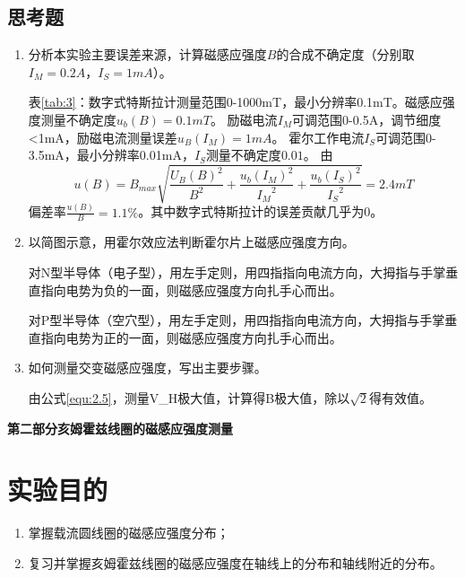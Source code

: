 \documentclass[11pt]{article}
\begin{document}
\subsection{思考题}
\begin{enumerate}
    \item 分析本实验主要误差来源，计算磁感应强度$B$的合成不确定度（分别取$I_M=0.2A$，$I_S=1mA$）。
    \par \hspace*{2em}表\ref{tab:3}：数字式特斯拉计测量范围0-1000mT，最小分辨率0.1mT。磁感应强度测量不确定度$u_b(B)=0.1mT$。
    励磁电流$I_M$可调范围0-0.5A，调节细度<1mA，励磁电流测量误差$u_B(I_M)=1mA$。
    霍尔工作电流$I_S$可调范围0-3.5mA，最小分辨率0.01mA，$I_S$测量不确定度$0.01$。
    由
    \[u(B)=B_{max}\sqrt{\frac{{U_B(B)}^2}{B^2}+\frac{{u_b(I_M)}^2}{{I_M}^2}+\frac{{u_b(I_S)}^2}{{I_S}^2}}=2.4mT\]
    偏差率$\frac{u(B)}{B}=1.1\%$。其中数字式特斯拉计的误差贡献几乎为0。
    \item 以简图示意，用霍尔效应法判断霍尔片上磁感应强度方向。
    \par \hspace*{2em}对N型半导体（电子型），用左手定则，用四指指向电流方向，大拇指与手掌垂直指向电势为负的一面，则磁感应强度方向扎手心而出。
    \par \hspace*{2em}对P型半导体（空穴型），用左手定则，用四指指向电流方向，大拇指与手掌垂直指向电势为正的一面，则磁感应强度方向扎手心而出。
    \item 如何测量交变磁感应强度，写出主要步骤。
    \par \hspace*{2em}由公式\eqref{equ:2.5}，测量V_H极大值，计算得B极大值，除以$\sqrt{2}$得有效值。
\end{enumerate}

\begin{center}
    \vspace*{1em}
    \Large \bf 第二部分\qquad 亥姆霍兹线圈的磁感应强度测量
\end{center}
\setcounter{section}{0}
\section{实验目的}
\begin{enumerate}
    \item 掌握载流圆线圈的磁感应强度分布；
    \item 复习并掌握亥姆霍兹线圈的磁感应强度在轴线上的分布和轴线附近的分布。
\end{enumerate}
\end{document}
